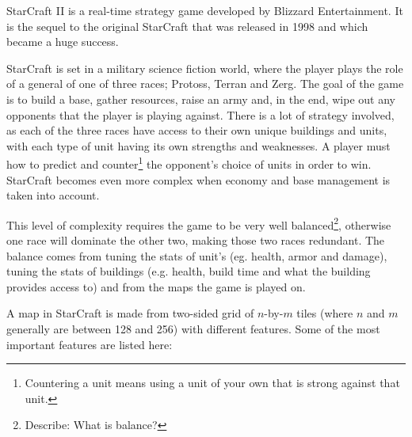 StarCraft II\cite{starcraft2} is a real-time strategy game developed by Blizzard Entertainment. It is the sequel to the original StarCraft\cite{starcraft} that was released in 1998 and which became a huge success.

StarCraft is set in a military science fiction world, where the player plays the role of a general of one of three races; Protoss, Terran and Zerg. The goal of the game is to build a base, gather resources, raise an army and, in the end, wipe out any opponents that the player is playing against. There is a lot of strategy involved, as each of the three races have access to their own unique buildings and units, with each type of unit having its own strengths and weaknesses. A player must how to predict and counter\footnote{Countering a unit means using a unit of your own that is strong against that unit.} the opponent's choice of units in order to win. StarCraft becomes even more complex when economy and base management is taken into account.


This level of complexity requires the game to be very well balanced\footnote{Describe: What is balance?}, otherwise one race will dominate the other two, making those two races redundant. The balance comes from tuning the stats of unit's (eg. health, armor and damage), tuning the stats of buildings (e.g. health, build time and what the building provides access to) and from the maps the game is played on.

A map in StarCraft is made from two-sided grid of $n$-by-$m$ tiles (where $n$ and $m$ generally are between 128 and 256) with different features. Some of the most important features are listed here:

